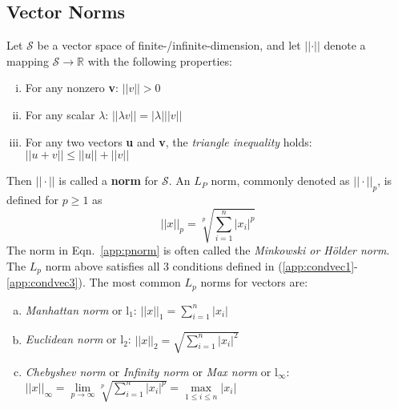 \documentclass[12pts,a4paper,amsmath,amssymb,floatfix]{article}%
\renewcommand\leq{\leqslant}
\renewcommand\geq{\geqslant}
\renewcommand\ge{\geqslant}
\newcommand{\textfrc}[1]{{\frcseries#1}}
\begin{document}
\subsection{Vector Norms}\label{app:NormDef}
Let $\mathcal{S}$ be a vector space of finite-/infinite-dimension, and let $\left|\left|\cdot\right|\right|$ denote a mapping $\mathcal{S}\rightarrow\mathbb{R}$ with the following properties:
\begin{enumerate}[(i)]
\item\label{app:condvec1} For any nonzero {\bf v}: $||v||>0$
\item\label{app:condvec2} For any scalar $\lambda$: $||\lambda v|| = |\lambda| ||v||$
\item\label{app:condvec3} For any two vectors {\bf u} and {\bf v}, the {\it triangle inequality} holds: $||u+v||\leq ||u|| + ||v||$
\end{enumerate} 
Then $||\cdot||$ is called a {\bf norm} for $\mathcal{S}$. An $L_{P}$ norm, commonly denoted as $||\cdot||_{p}$, is defined for $p\geq 1$ as
\begin{equation}
||x||_{p} = \sqrt[p]{\sum\limits_{i=1}^{n}|x_{i}|^{p}}\label{app:pnorm}
\end{equation}
The norm in Eqn.~\ref{app:pnorm} is often called the {\it Minkowski or H\"older norm}. The $L_{p}$ norm above satisfies all 3 conditions defined in (\ref{app:condvec1}-\ref{app:condvec3}). The most common $L_{p}$ norms for vectors are:
\begin{enumerate}[(a)]  
\item {\it Manhattan norm} or \textfrc{l}$_{1}$: $\left|\left|x\right|\right|_{1}=\displaystyle\sum\limits_{i=1}^{n}\left|x_{i}\right|$
\item {\it Euclidean norm} or \textfrc{l}$_{2}$: $\left|\left|x\right|\right|_{2}=\sqrt{\displaystyle\sum\limits_{i=1}^{n}\left|x_{i}\right|^{2}}$
\item {\it Chebyshev norm} or {\it Infinity norm} or {\it Max norm} or \textfrc{l}$_{\infty}$: $\left|\left|x\right|\right|_{\infty}=\lim\limits_{p\rightarrow\infty}\sqrt[p]{\displaystyle\sum\limits_{i=1}^{n}\left|x_{i}\right|^{p}} = \displaystyle\max\limits_{1\leq i\leq n}\left|x_{i}\right|$
\end{enumerate}
\end{document}
